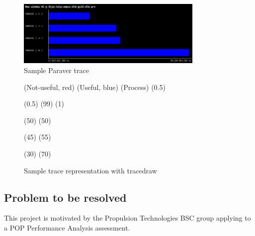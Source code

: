 \begin{itemize}
    \begin{figure}[htbp]
      \centering
      \includegraphics[width=0.8\textwidth]{sample_trace}
      \caption{Sample Paraver trace}
      \label{fig:trace}
    \end{figure}

    \begin{figure}[htbp]
      \begin{tracedraw}
        \tracedrawAddToLegend(\large{Not-useful}, red)
        \tracedrawAddToLegend(\large{Useful}, blue)
        \tracedrawEnableLineName(\large{Process})
        \tracedrawSetLegendColorScale(0.5)

        \tracedrawSetLineHeight(0.5)
        \tracedrawAddChunk[color=gray, fill=blue](99)
        \tracedrawAddChunk[color=gray, fill=red](1)

        \tracedrawNewLine

        \tracedrawAddChunk[color=gray, fill=blue](50)
        \tracedrawAddChunk[color=gray, fill=red](50)

        \tracedrawNewLine
        
        \tracedrawAddChunk[color=gray, fill=blue](45)
        \tracedrawAddChunk[color=gray, fill=red](55)

        \tracedrawNewLine
        
        \tracedrawAddChunk[color=gray, fill=blue](30)
        \tracedrawAddChunk[color=gray, fill=red](70)

      \end{tracedraw}
      \caption{Sample trace representation with tracedraw}
      \label{fig:tracedraw}
    \end{figure}

\end{itemize}

\subsection{Problem to be resolved}
\justify
This project is motivated by the Propulsion Technologies BSC group applying to a POP Performance Analysis assessment.


